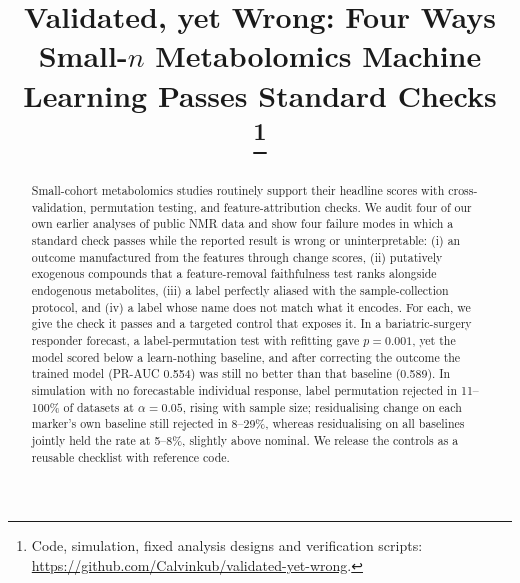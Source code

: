 \documentclass[conference]{IEEEtran}
\newcommand{\verified}[1]{#1}  %
\begin{document}
\title{Validated, yet Wrong: Four Ways Small-$n$ Metabolomics Machine Learning Passes Standard Checks\\
\thanks{Code, simulation, fixed analysis designs and verification scripts: \protect\url{https://github.com/Calvinkub/validated-yet-wrong}.}}

\author{
\and
{}
}

\maketitle

\begin{abstract}
Small-cohort metabolomics studies routinely support their headline scores with
cross-validation, permutation testing, and feature-attribution checks. We
audit four of our own earlier analyses of public NMR data and show four
failure modes in which a standard check passes while the reported result is
wrong or uninterpretable: (i) an outcome manufactured from the features
through change scores, (ii) putatively exogenous compounds that a
feature-removal faithfulness test ranks alongside endogenous metabolites,
(iii) a label perfectly aliased with the sample-collection protocol, and
(iv) a label whose name does not match what it encodes. For each, we give the
check it passes and a targeted control that exposes it. In a bariatric-surgery
responder forecast, a label-permutation test with refitting gave
$p=\verified{0.001}$, yet the model scored below a learn-nothing baseline, and
after correcting the outcome the trained model (PR-AUC \verified{0.554}) was
still no better than that baseline (\verified{0.589}).
In simulation with no forecastable individual response, label permutation
rejected in 11--100\% of datasets at $\alpha=0.05$, rising with sample size;
residualising change on each marker's own baseline still rejected in
8--29\%, whereas residualising on all baselines jointly held the rate at
5--8\%, slightly above nominal. We release the controls as a reusable
checklist with reference code.
\end{abstract}
\end{document}
